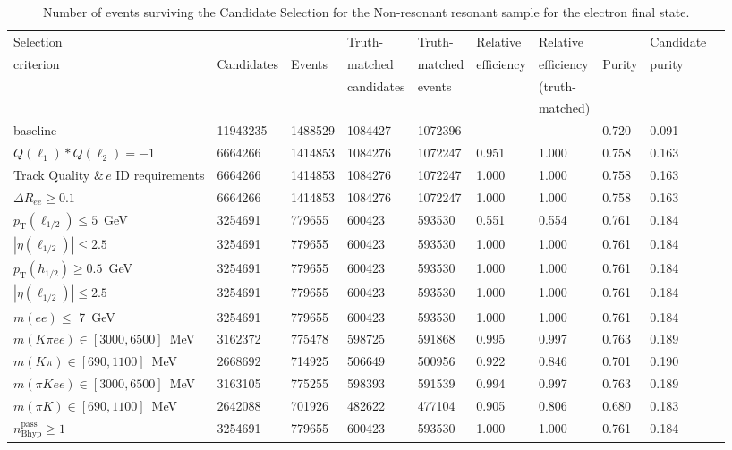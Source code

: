 \begin{table}[ht] 
\caption{Number of events surviving the Candidate Selection for the Non-resonant resonant sample for the electron final state.} 
\centering 
\hspace*{-1.cm}
{\small
\begin{tabular}{l | l l| l l| l l| l |ll }
\hline\hline
Selection &             &        & Truth- & Truth- & Relative & Relative &  &  Candidate\\
criterion & Candidates  & Events & matched & matched & efficiency & efficiency & Purity & purity\\
          &             &        & candidates & events &          & (truth- & &\\
          &             &        &   &   &          & matched) & & \\        
\hline
baseline& 11943235& 1488529& 1084427& 1072396&&& 0.720& 0.091\\
$Q(\ell_{1}) * Q(\ell_{2}) = -1$& 6664266& 1414853& 1084276& 1072247& 0.951& 1.000& 0.758& 0.163\\
Track Quality $\&\,e$ ID requirements& 6664266& 1414853& 1084276& 1072247& 1.000& 1.000& 0.758& 0.163\\
$\Delta R_{ee}\geq  0.1$& 6664266& 1414853& 1084276& 1072247& 1.000& 1.000& 0.758& 0.163\\
$p_{\mathrm{T}}(\ell_{1/2}) \leq 5$~GeV& 3254691& 779655& 600423& 593530& 0.551& 0.554& 0.761& 0.184\\
$|\eta(\ell_{1/2})| \leq 2.5$& 3254691& 779655& 600423& 593530& 1.000& 1.000& 0.761& 0.184\\
$p_{\mathrm{T}}(h_{1/2}) \geq 0.5$~GeV& 3254691& 779655& 600423& 593530& 1.000& 1.000& 0.761& 0.184\\
$|\eta(\ell_{1/2})| \leq 2.5$& 3254691& 779655& 600423& 593530& 1.000& 1.000& 0.761& 0.184\\
$m(ee) \leq$ 7~GeV& 3254691& 779655& 600423& 593530& 1.000& 1.000& 0.761& 0.184\\
\hline
$m(K\pi ee) \in [3000,6500]$~MeV& 3162372& 775478& 598725& 591868& 0.995& 0.997& 0.763& 0.189\\
$m(K\pi) \in [690,1100]$~MeV& 2668692& 714925& 506649& 500956& 0.922& 0.846& 0.701& 0.190\\
\hline
$m(\pi Kee) \in [3000,6500]$~MeV& 3163105& 775255& 598393& 591539& 0.994& 0.997& 0.763& 0.189\\
$m(\pi K) \in [690,1100]$~MeV& 2642088& 701926& 482622& 477104& 0.905& 0.806& 0.680& 0.183\\
\hline
$n_{\mathrm{B hyp}}^{\mathrm{pass}} \geq 1$& 3254691& 779655& 600423& 593530& 1.000& 1.000& 0.761& 0.184\\
\hline
\hline
\end{tabular} 
}
\label{tab:presel:sigele}
\end{table}


